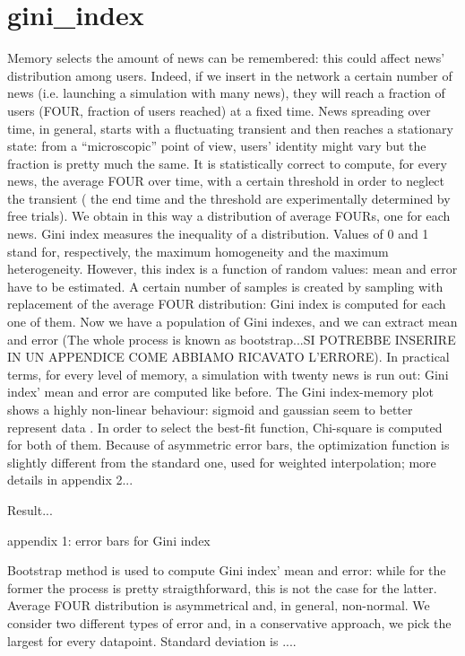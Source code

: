 \section{gini_index}
Memory selects the amount of news can be remembered: this could affect news' distribution among users.
Indeed, if we insert in the network a certain number of news (i.e. launching a simulation with many news), they will reach a fraction of users (FOUR, fraction of users reached) at a fixed time.
News spreading over time, in general, starts with a fluctuating transient and then reaches a stationary state: from a ``microscopic'' point of view, users' identity might vary but the fraction is pretty much the same. 
It is statistically correct to compute, for every news, the average FOUR over time, with a certain threshold in order to neglect the transient ( the end time and the threshold are experimentally determined by free trials).
We obtain in this  way a distribution of average FOURs, one for each news.
Gini index measures the inequality of a distribution. Values of 0 and 1 stand for, respectively, the maximum homogeneity and the maximum heterogeneity.
However, this index is a function of random values: mean and error have to be estimated.
A certain number of samples is created by sampling with replacement of the average FOUR distribution: Gini index is computed for each one of them.
Now we have a population of Gini indexes, and we can extract mean and error (The whole process is known as bootstrap...SI POTREBBE INSERIRE IN UN APPENDICE COME ABBIAMO RICAVATO L'ERRORE).
In practical terms, for every level of  memory, a simulation with twenty news is run out: Gini index' mean and error are computed like before.
The Gini index-memory plot shows a highly non-linear behaviour: sigmoid and gaussian seem to better represent data . In order to select the best-fit function, Chi-square is computed for both of them. 
Because of asymmetric error bars, the optimization function is slightly different from the standard one, used for weighted interpolation; more details in appendix 2...

Result...



appendix 1: error bars for Gini index

Bootstrap method is used to compute Gini index' mean and error: while for the former the process is pretty straigthforward, this is not the case for the latter.
Average FOUR distribution is asymmetrical and, in general, non-normal. We consider two different types of error  and, in a conservative approach, we pick the largest for every datapoint.
Standard deviation is ....


